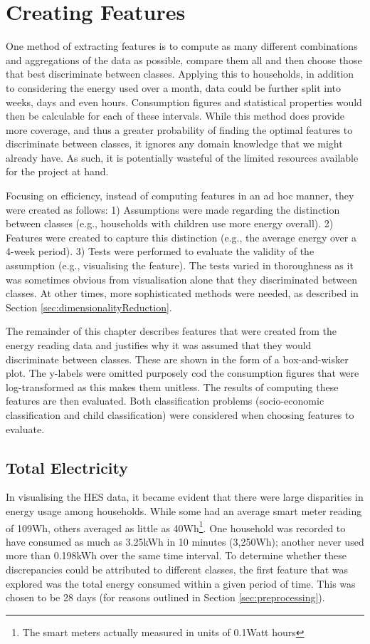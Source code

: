 \qqPlot


\section{Creating Features}
\label{sec:creatingFeatures}
One method of extracting features is to compute as many different combinations and aggregations of the data as possible, compare them all and then choose those that best discriminate between classes. Applying this to households, in addition to considering the energy used over a month, data could be further split into weeks, days and even hours. Consumption figures and statistical properties would then be calculable for each of these intervals. While this method does provide more coverage, and thus a greater probability of finding the optimal features to discriminate between classes, it ignores any domain knowledge that we might already have. As such, it is potentially wasteful of the limited resources available for the project at hand. 

Focusing on efficiency, instead of computing features in an ad hoc manner, they were created as follows: 1) Assumptions were made regarding the distinction between classes (e.g., households with children use more energy overall). 2) Features were created to capture this distinction (e.g., the average energy over a 4-week period). 3) Tests were performed to evaluate the validity of the assumption (e.g., visualising the feature). The tests varied in thoroughness as it was sometimes obvious from visualisation alone that they discriminated between classes. At other times, more sophisticated methods were needed, as described in Section \ref{sec:dimensionalityReduction}. %

The remainder of this chapter describes features that were created from the energy reading data and justifies why it was assumed that they would discriminate between classes. These are shown in the form of a box-and-wisker plot. The y-labels were omitted purposely cod the consumption figures that were log-transformed as this makes them unitless. The results of computing these features are then evaluated. Both classification problems (socio-economic classification and child classification) were considered when choosing features to evaluate.

\subsection*{Total Electricity}
In visualising the HES data, it became evident that there were large disparities in energy usage among households. While some had an average smart meter reading of 109Wh, others averaged as little as 40Wh\footnote{The smart meters actually measured in units of 0.1Watt hours}. One household was recorded to have consumed as much as 3.25kWh in 10 minutes (3,250Wh); another never used more than 0.198kWh over the same time interval. To determine whether these discrepancies could be attributed to different classes, the first feature that was explored was the total energy consumed within a given period of time. This was chosen to be  28 days (for reasons outlined in Section \ref{sec:preprocessing}). 

